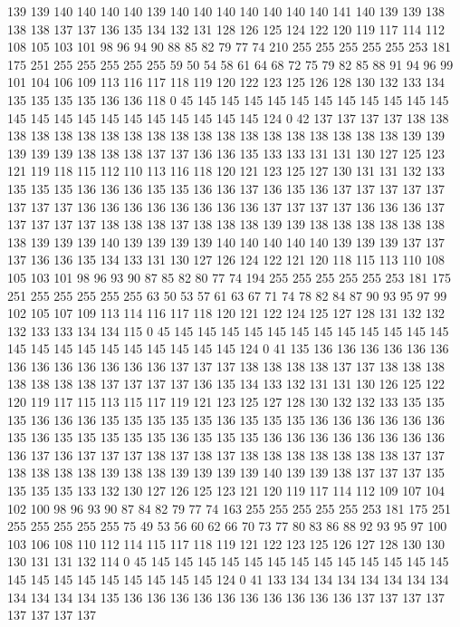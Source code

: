 139 139 140 140 140 140 139 140 140 140 140 140 140 140 141 140 139 139 138 138
138 137 137 136 135 134 132 131 128 126 125 124 122 120 119 117 114 112 108 105
103 101 98 96 94 90 88 85 82 79 77 74 210 255 255 255 255 255 253 181
175 251 255 255 255 255 255 59 50 54 58 61 64 68 72 75 79 82 85 88
91 94 96 99 101 104 106 109 113 116 117 118 119 120 122 123 125 126 128 130
132 133 134 135 135 135 135 136 136 118 0 45 145 145 145 145 145 145 145 145
145 145 145 145 145 145 145 145 145 145 145 145 145 145 124 0 42 137 137 137
137 138 138 138 138 138 138 138 138 138 138 138 138 138 138 138 138 138 138 138
139 139 139 139 139 138 138 138 137 137 136 136 135 133 133 131 131 130 127 125
123 121 119 118 115 112 110 113 116 118 120 121 123 125 127 130 131 131 132 133
135 135 135 136 136 136 135 135 136 136 137 136 135 136 137 137 137 137 137 137
137 137 136 136 136 136 136 136 136 136 137 137 137 137 136 136 136 137 137 137
137 137 138 138 138 137 138 138 138 139 139 138 138 138 138 138 138 138 139 139
139 140 139 139 139 139 140 140 140 140 140 139 139 139 137 137 137 136 136 135
134 133 131 130 127 126 124 122 121 120 118 115 113 110 108 105 103 101 98 96
93 90 87 85 82 80 77 74 194 255 255 255 255 255 253 181 175 251 255 255
255 255 255 63 50 53 57 61 63 67 71 74 78 82 84 87 90 93 95 97
99 102 105 107 109 113 114 116 117 118 120 121 122 124 125 127 128 131 132 132
132 133 133 134 134 115 0 45 145 145 145 145 145 145 145 145 145 145 145 145
145 145 145 145 145 145 145 145 145 145 124 0 41 135 136 136 136 136 136 136
136 136 136 136 136 136 136 137 137 137 138 138 138 138 137 137 138 138 138 138
138 138 138 137 137 137 137 136 135 134 133 132 131 131 130 126 125 122 120 119
117 115 113 115 117 119 121 123 125 127 128 130 132 132 133 135 135 135 136 136
136 135 135 135 135 135 136 135 135 135 136 136 136 136 136 136 135 136 135 135
135 135 135 136 135 135 135 136 136 136 136 136 136 136 136 136 137 136 137 137
137 138 137 138 137 138 138 138 138 138 138 138 137 137 138 138 138 138 139 138
138 139 139 139 139 140 139 139 138 137 137 137 135 135 135 135 133 132 130 127
126 125 123 121 120 119 117 114 112 109 107 104 102 100 98 96 93 90 87 84
82 79 77 74 163 255 255 255 255 255 253 181 175 251 255 255 255 255 255 75
49 53 56 60 62 66 70 73 77 80 83 86 88 92 93 95 97 100 103 106
108 110 112 114 115 117 118 119 121 122 123 125 126 127 128 130 130 130 131 131
132 114 0 45 145 145 145 145 145 145 145 145 145 145 145 145 145 145 145 145
145 145 145 145 145 145 124 0 41 133 134 134 134 134 134 134 134 134 134 134
134 135 136 136 136 136 136 136 136 136 136 136 137 137 137 137 137 137 137 137

